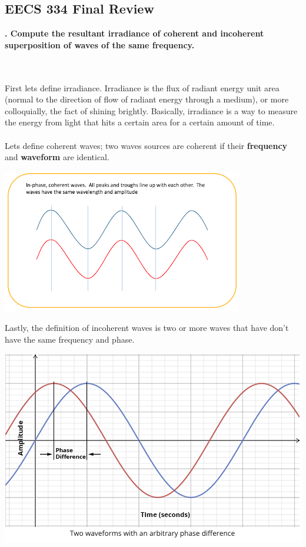 \documentclass[10pt]{article}
\newcounter{counter}
\newcommand*{\question}[1]{
            \textbf{\thecounter. #1} \hfill
            \addtocounter{counter}{1}
            \\ \\
            }
\begin{document}
\begin{center}
    \section*{EECS 334 Final Review}
\end{center}
\question{Compute the resultant irradiance of coherent and incoherent superposition of waves of the same frequency.}
First lets define irradiance. Irradiance is the flux of radiant energy unit area (normal to the direction of flow of radiant energy through a medium), or more colloquially, the fact of shining brightly. Basically, irradiance is a way to measure the energy from light that hits a certain area for a certain amount of time.
\\ \\ 
Lets define coherent waves; two waves sources are coherent if their \textbf{frequency} and \textbf{waveform} are identical.
\begin{center}
    \includegraphics*[scale = 1]{imgs/coherent-wave.png}    
\end{center}

Lastly, the definition of incoherent waves is two or more waves that have don't have the same frequency and phase.

\begin{center}
    \includegraphics*[scale = .5]{imgs/phase-difference.png}
\end{center}
\end{document}
